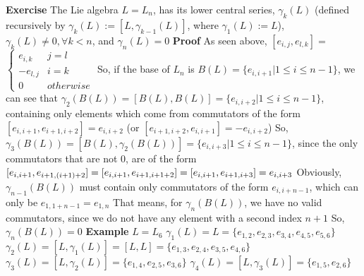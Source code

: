 \documentclass[12pt]{article}
\begin{document}
\textbf{Exercise} \newline
The Lie algebra $L=L_n$, has its lower central series, \newline
$\gamma_k(L)$ (defined recursively by $\gamma_k(L):=[L,\gamma_{k-1}(L)]$, where $\gamma_1(L):=L$), \newline
$\gamma_k(L) \neq 0,\forall k<n$, and $\gamma_n(L)=0$ \newline
\newpage
\textbf{Proof} \newline
As seen above, $[e_{i,j},e_{l,k}]=$
$ \left \{
	\begin{array}{ll}
		e_{i,k}  & j=l \\
        -e_{l,j}  & i=k \\
		0 & otherwise
	\end{array}
\right.
$
\newline 
So, if the base of $L_n$ is $B(L)=
\{ e_{i,i+1} | 1 \leq i \leq n-1 \}$, we can see that \newline
$\gamma_2(B(L))=[B(L),B(L)]=\{ e_{i,i+2} | 1 \leq i \leq n-1 \}$, \newline
containing only elements which come from commutators of the form \newline
$[e_{i,i+1},e_{i+1,i+2}]=e_{i,i+2}$ (or $[e_{i+1,i+2},e_{i,i+1}]=
-e_{i,i+2}$) \newline
So, $\gamma_3(B(L))=[B(L),\gamma_2(B(L))]=\{ e_{i,i+3} | 1 \leq i \leq n-1 \}$, since the only commutators that are not 0, are of the form $[e_{i,i+1},e_{i+1,(i+1)+2}]=[e_{i,i+1},e_{i+1,i+1+2}] \newline
=[e_{i,i+1},e_{i+1,i+3}]=e_{i,i+3}$ \newline
Obviously, $\gamma_{n-1}(B(L))$ must contain only commutators of the form $e_{i,i+n-1}$, which can only be $e_{1,1+n-1}=e_{1,n}$ \newline
That means, for $\gamma_{n}(B(L))$, we have no valid commutators, since we do not have any element with a second index $n+1$ \newline
So, $\gamma_{n}(B(L))=0$ \newline
\newline
\textbf{Example} $L=L_6$ \newline
$\gamma_1(L)=L=\{e_{1,2},e_{2,3},e_{3,4},e_{4,5},e_{5,6}\}$ \newline
$\gamma_2(L)=[L,\gamma_1(L)]=
[L,L]=\{e_{1,3},e_{2,4},e_{3,5},e_{4,6}\}$ 
\newline
$\gamma_3(L)=[L,\gamma_2(L)]=\{e_{1,4},e_{2,5},e_{3,6}\}$ 
\newline
$\gamma_4(L)=[L,\gamma_3(L)]=\{e_{1,5},e_{2,6}\}$ 
\end{document}

